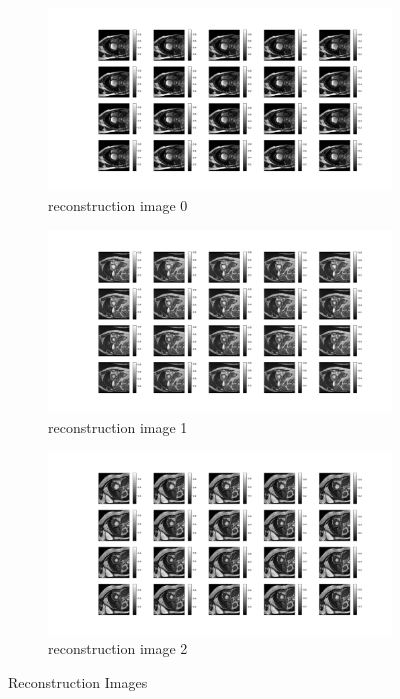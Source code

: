 \documentclass{article}
\begin{document}
\begin{figure}[ht]
  \centering
  \begin{subfigure}[b]{0.8\linewidth}
    \includegraphics[width=\linewidth]{../images/output/reconstruction/reconstruction_0.png}
    \caption{reconstruction image 0}
  \end{subfigure}
  \quad
  \begin{subfigure}[b]{0.8\linewidth}
    \includegraphics[width=\linewidth]{../images/output/reconstruction/reconstruction_1.png}
    \caption{reconstruction image 1}
  \end{subfigure}
  \quad
  \begin{subfigure}[b]{0.8\linewidth}
    \includegraphics[width=\linewidth]{../images/output/reconstruction/reconstruction_2.png}
    \caption{reconstruction image 2}
  \end{subfigure}
  \caption{Reconstruction Images}
\end{figure}
\end{document}
